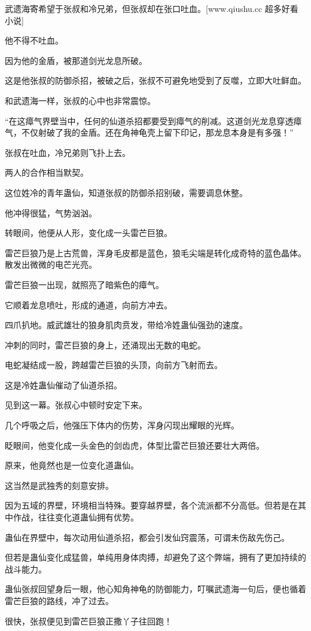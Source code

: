 \begin{this_body}
武遗海寄希望于张叔和冷兄弟，但张叔却在张口吐血。[www.qiushu.cc 超多好看小说]

他不得不吐血。

因为他的金盾，被那道剑光龙息所破。

这是他张叔的防御杀招，被破之后，张叔不可避免地受到了反噬，立即大吐鲜血。

和武遗海一样，张叔的心中也非常震惊。

“在这瘴气界壁当中，任何的仙道杀招都要受到瘴气的削减。这道剑光龙息穿透瘴气，不仅射破了我的金盾。还在角神龟壳上留下印记，那龙息本身是有多强！”

张叔在吐血，冷兄弟则飞扑上去。

两人的合作相当默契。

这位姓冷的青年蛊仙，知道张叔的防御杀招别破，需要调息休整。

他冲得很猛，气势汹汹。

转眼间，他便从人形，变化成一头雷芒巨狼。

雷芒巨狼乃是上古荒兽，浑身毛皮都是蓝色，狼毛尖端是转化成奇特的蓝色晶体。散发出微微的电芒光亮。

雷芒巨狼一出现，就照亮了暗紫色的瘴气。

它顺着龙息喷吐，形成的通道，向前方冲去。

四爪扒地。威武雄壮的狼身肌肉贲发，带给冷姓蛊仙强劲的速度。

冲刺的同时，雷芒巨狼的身上，还涌现出无数的电蛇。

电蛇凝结成一股，跨越雷芒巨狼的头顶，向前方飞射而去。

这是冷姓蛊仙催动了仙道杀招。

见到这一幕。张叔心中顿时安定下来。

几个呼吸之后，他强压下体内的伤势，浑身闪现出耀眼的光辉。

眨眼间，他变化成一头金色的剑齿虎，体型比雷芒巨狼还要壮大两倍。

原来，他竟然也是一位变化道蛊仙。

这当然是武独秀的刻意安排。

因为五域的界壁，环境相当特殊。要穿越界壁，各个流派都不分高低。但若是在其中作战，往往变化道蛊仙拥有优势。

蛊仙在界壁中，每次动用仙道杀招，都会引发仙窍震荡，可谓未伤敌先伤己。

但若是蛊仙变化成猛兽，单纯用身体肉搏，却避免了这个弊端，拥有了更加持续的战斗能力。

蛊仙张叔回望身后一眼，他心知角神龟的防御能力，叮嘱武遗海一句后，便也循着雷芒巨狼的路线，冲了过去。

很快，张叔便见到雷芒巨狼正撒丫子往回跑！


\end{this_body}
